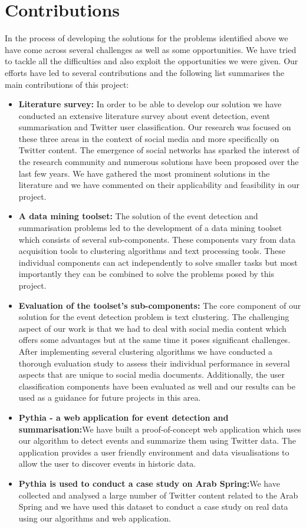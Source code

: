 \section{Contributions}
In the process of developing the solutions for the problems identified above we have come across several
challenges as well as some opportunities. We have tried to tackle all the difficulties and also exploit the 
opportunities we were given. Our efforts have led to several contributions and the following list summarises the main contributions of this project:
\begin{itemize}
 \item \textbf{Literature survey:} In order to be able to develop our solution we have conducted an extensive literature survey about event detection, event summarisation and Twitter user classification. 
 Our research was focused on these three areas in the context of social media and more specifically on Twitter content. The emergence of social networks has sparked the interest of the research community and 
 numerous solutions have been proposed over the last few years. We have gathered the most prominent solutions in the literature and we have commented on their applicability and 
 feasibility in our project.
 \item \textbf{A data mining toolset:} The solution of the event detection and summarisation problems led to the development of a data mining toolset which consists of 
 several sub-components. These components vary from data acquisition tools to clustering algorithms and text processing tools. These
 individual components can act independently to solve smaller tasks but most importantly they can be combined to solve the problems posed 
 by this project.  
 \item \textbf{Evaluation of the toolset's sub-components:} The core component of our solution for the event detection problem is text clustering. The challenging aspect of our work is that we had to deal with social media content
 which offers some advantages but at the same time it poses significant challenges. After implementing several clustering algorithms we have conducted a thorough evaluation study to assess their individual performance in several aspects that are unique to social media documents. Additionally, the user classification components have been evaluated as well and our results can be used as a guidance for future projects in this area.      
 \item \textbf{Pythia - a web application for event detection and summarisation:}We have built a proof-of-concept web application which uses our algorithm to detect events and summarize them using Twitter data. The application provides a user friendly
 environment and data visualisations to allow the user to discover events in historic data.
 \item \textbf{Pythia is used to conduct a case study on Arab Spring:}We have collected and analysed a large number of Twitter content related to the Arab Spring and we have used this dataset to conduct a case study on real data using
 our algorithms and web application.  	 
\end{itemize}\vspace{15pt}
